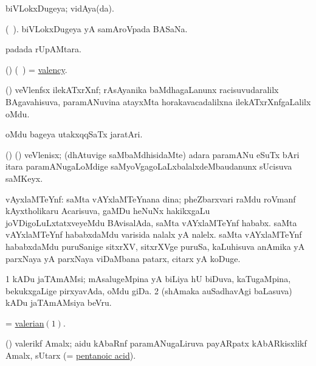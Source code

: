 \bentry 
{} 
\gl{\gu}
\expl{}
\bmng
 biVLokxDugeya; vidAya(da). 
\emng
\eentry

\bentry
{} 
\gl{\nA}(\bava\ ). 
\bmng
 biVLokxDugeya yA samAroVpada BASaNa. 
\emng
\eentry

\bentry
{} 
\gl{\nA}
\expl{}
\bmng
  padada rUpAMtara. 
\emng
\eentry

\bentry
{} 
\gl{\nA}
\expl{}
\bmng
 (\ravi) (\kanmu\ \ame) = \hyperlink{valency}{valency}. 
\emng
\eentry

\bentry 
{}
\gl{\nA}
\expl{}
\bmng
 (\ravi) veVlenfsx ilekATxrXnf; rAsAyanika baMdhagaLanunx racisuvudaralilx BAgavahisuva, paramANuvina atayxMta horakavacadalilxna ilekATxrXnfgaLalilx oMdu. 
\emng
\eentry

\bentry
{} 
\gl{\nA}
\expl{}
\bmng
oMdu bageya utakxqqSaTx jaratAri. 
\emng
\eentry

\bentry
{} 
\gl{\nA}
\bmng
 (\birx) (\ravi) veVlenisx; (dhAtuvige saMbaMdhisidaMte) adara paramANu eSuTx bAri itara paramANugaLoMdige saMyoVgagoLaLxbalalxdeMbaudanunx sUcisuva saMKeyx. 
\emng
\eentry

\bentry
{} 
\gl{\nA}
\expl{}
\bmng
 vAyxlaMTeYnf: 
\banum
{} saMta vAYxlaMTeYnana dina; pheZbarxvari raMdu roVmanf kAyxtholikaru Acarisuva, gaMDu heNuNx hakikxgaLu joVDigoLuLxtatxveyeMdu BAvisalAda, saMta vAYxlaMTeYnf hababx. 
 saMta vAYxlaMTeYnf hababxdaMdu varisida nalalx yA nalelx. 
 saMta vAYxlaMTeYnf hababxdaMdu puruSanige sitxrXV, sitxrXVge puruSa, kaLuhisuva anAmika yA parxNaya yA parxNaya viDaMbana patarx, citarx yA koDuge. 
\eanum
\emng
\eentry

\bentry
{} 
\gl{\nA}
\expl{}
\bmng
\bnum
\num{1} kADu jaTAmAMsi; mAsalugeMpina yA biLiya hU biDuva, kaTugaMpina, bekukxgaLige pirxyavAda, oMdu giDa. 
\num{2} (shAmaka auSadhavAgi baLasuva) kADu jaTAmAMsiya beVru. 
\enum
\emng

\noindent
\gl{\pagu}
\bmng
{} = \hyperlink{valerian}{valerian\((1)\)}. 
\emng
\eentry


\bentry
{} 
\gl{\nA}
\expl{}
\bmng
 (\ravi) valerikf Amalx; aidu kAbaRnf paramANugaLiruva payARpatx kAbARkisxlikf Amalx, sUtarx  (= \hyperref{kandict_p.pdf}{P}{pentanoic acid}{pentanoic acid}). 
\emng
\eentry

